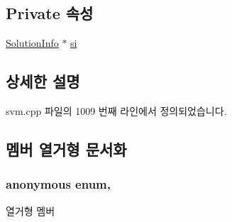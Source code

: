 \subsection*{Private 속성}
\begin{DoxyCompactItemize}
\item 
\hyperlink{struct_solver_1_1_solution_info}{Solution\+Info} $\ast$ \hyperlink{class_solver___n_u_ab4f51d421dfaec61482401ff5ef0d86c}{si}
\end{DoxyCompactItemize}


\subsection{상세한 설명}


svm.\+cpp 파일의 1009 번째 라인에서 정의되었습니다.



\subsection{멤버 열거형 문서화}
\hypertarget{class_solver_a86c1a7637bc803ef8496c7dbf7f00b03}{\subsubsection[{anonymous enum}]{\setlength{\rightskip}{0pt plus 5cm}anonymous enum\hspace{0.3cm}{\ttfamily [protected]}, {\ttfamily [inherited]}}}\label{class_solver_a86c1a7637bc803ef8496c7dbf7f00b03}
\begin{Desc}
\item[열거형 멤버]\par
\begin{description}
\item[{\em 
\hypertarget{class_solver_a86c1a7637bc803ef8496c7dbf7f00b03aeb78558e05ec0672378c3e801e866560}{L\+O\+W\+E\+R\+\_\+\+B\+O\+U\+N\+D}\label{class_solver_a86c1a7637bc803ef8496c7dbf7f00b03aeb78558e05ec0672378c3e801e866560}
}]\item[{\em 
\hypertarget{class_solver_a86c1a7637bc803ef8496c7dbf7f00b03aef825a32b2471cdb0724cfa9c1f051fd}{U\+P\+P\+E\+R\+\_\+\+B\+O\+U\+N\+D}\label{class_solver_a86c1a7637bc803ef8496c7dbf7f00b03aef825a32b2471cdb0724cfa9c1f051fd}
}]\item[{\em 
\hypertarget{class_solver_a86c1a7637bc803ef8496c7dbf7f00b03a904f6af2170b6f900fbd3d46cd055c76}{F\+R\+E\+E}\label{class_solver_a86c1a7637bc803ef8496c7dbf7f00b03a904f6af2170b6f900fbd3d46cd055c76}
}]\end{description}
\end{Desc}


